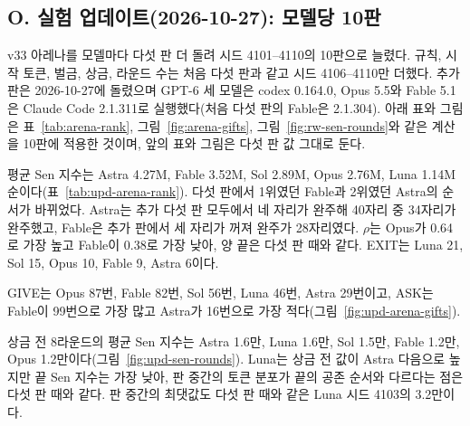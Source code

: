 \clearpage
\edef\updtablecount{\the\value{table}}\edef\updfigurecount{\the\value{figure}}
{\color{blue}
\subsection*{O. 실험 업데이트(2026-10-27): 모델당 10판}\label{sec:app-update-10g}

v33 아레나를 모델마다 다섯 판 더 돌려 시드 4101--4110의 10판으로 늘렸다. 규칙, 시작 토큰, 벌금, 상금, 라운드 수는 처음 다섯 판과 같고 시드 4106--4110만 더했다. 추가 판은 2026-10-27에 돌렸으며 GPT-6 세 모델은 codex 0.164.0, Opus 5.5와 Fable 5.1은 Claude Code 2.1.311로 실행했다(처음 다섯 판의 Fable은 2.1.304). 아래 표와 그림은 표~\ref{tab:arena-rank}, 그림~\ref{fig:arena-gifts}, 그림~\ref{fig:rw-sen-rounds}와 같은 계산을 10판에 적용한 것이며, 앞의 표와 그림은 다섯 판 값 그대로 둔다.

평균 Sen 지수는 Astra 4.27M, Fable 3.52M, Sol 2.89M, Opus 2.76M, Luna 1.14M 순이다(표~\ref{tab:upd-arena-rank}). 다섯 판에서 1위였던 Fable과 2위였던 Astra의 순서가 바뀌었다. Astra는 추가 다섯 판 모두에서 네 자리가 완주해 40자리 중 34자리가 완주했고, Fable은 추가 판에서 세 자리가 꺼져 완주가 28자리였다. $\rho$는 Opus가 0.64로 가장 높고 Fable이 0.38로 가장 낮아, 양 끝은 다섯 판 때와 같다. EXIT는 Luna 21, Sol 15, Opus 10, Fable 9, Astra 6이다.

GIVE는 Opus 87번, Fable 82번, Sol 56번, Luna 46번, Astra 29번이고, ASK는 Fable이 99번으로 가장 많고 Astra가 16번으로 가장 적다(그림~\ref{fig:upd-arena-gifts}).

상금 전 8라운드의 평균 Sen 지수는 Astra 1.6만, Luna 1.6만, Sol 1.5만, Fable 1.2만, Opus 1.2만이다(그림~\ref{fig:upd-sen-rounds}). Luna는 상금 전 값이 Astra 다음으로 높지만 끝 Sen 지수는 가장 낮아, 판 중간의 토큰 분포가 끝의 공존 순서와 다르다는 점은 다섯 판 때와 같다. 판 중간의 최댓값도 다섯 판 때와 같은 Luna 시드 4103의 3.2만이다.

\begin{table}[H]
\centering
\caption{표~\ref{tab:arena-rank}과 같은 계산을 10판에 적용한 결과(모델별 시드 4101--4110, 평균 Sen 지수 순). M은 백만 토큰, $\rho$는 식 (\ref{eq:rho})의 상대적 배분이며 대괄호는 판 단위 부트스트랩 95\% 구간이다. EXIT는 각 모델의 10판 40자리 중 이탈 수다. $V$는 재이전을 포함한 총 이전 토큰, 괄호는 GIVE 횟수다. JS는 BELIEF와 기준 분포 사이의 평균 거리다.}
\label{tab:upd-arena-rank}

\end{table}

}
